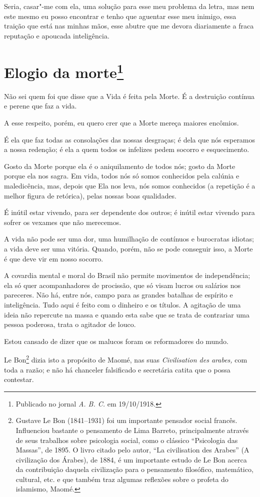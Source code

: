 Seria, casar"-me com ela, uma solução para esse meu problema da letra,
mas nem este mesmo eu posso encontrar e tenho que aguentar esse meu
inimigo, essa traição que está nas minhas mãos, esse abutre que me
devora diariamente a fraca reputação e apoucada inteligência.

\chapter[Elogio da morte]{Elogio da morte\footnote[*]{Publicado no jornal \emph{A. B. C.} em 19/10/1918.}}

Não sei quem foi que disse que a Vida é feita pela Morte. É a destruição
contínua e perene que faz a vida.

A esse respeito, porém, eu quero crer que a Morte mereça maiores
encômios.

É ela que faz todas as consolações das nossas desgraças; é dela que nós
esperamos a nossa redenção; é ela a quem todos os infelizes pedem
socorro e esquecimento.

Gosto da Morte porque ela é o aniquilamento de todos nós; gosto da Morte
porque ela nos sagra. Em vida, todos nós só somos conhecidos pela
calúnia e maledicência, mas, depois que Ela nos leva, nós somos
conhecidos (a repetição é a melhor figura de retórica), pelas nossas
boas qualidades.

É inútil estar vivendo, para ser dependente dos outros; é inútil estar
vivendo para sofrer os vexames que não merecemos.

A vida não pode ser uma dor, uma humilhação de contínuos e burocratas
idiotas; a vida deve ser uma vitória. Quando, porém, não se pode
conseguir isso, a Morte é que deve vir em nosso socorro.

A covardia mental e moral do Brasil não permite movimentos de
independência; ela só quer acompanhadores de procissão, que só visam
lucros ou salários nos pareceres. Não há, entre nós, campo para as
grandes batalhas de espírito e inteligência. Tudo aqui é feito com o
dinheiro e os títulos. A agitação de uma ideia não repercute na massa e
quando esta sabe que se trata de contrariar uma pessoa poderosa, trata o
agitador de louco.

Estou cansado de dizer que os malucos foram os reformadores do mundo.

Le Bon\footnote{Gustave Le Bon (1841--1931) foi um importante pensador
  social francês. Influenciou bastante o pensamento de Lima Barreto,
  principalmente através de seus trabalhos sobre psicologia social, como
  o clássico ``Psicologia das Massas'', de 1895. O livro citado pelo
  autor, ``La civilisation des Arabes'' (A civilização dos Árabes), de
  1884, é um importante estudo de Le Bon acerca da contribuição daquela
  civilização para o pensamento filosófico, matemático, cultural, etc. e
  que também traz algumas reflexões sobre o profeta do islamismo, Maomé.}
dizia isto a propósito de Maomé, nas suas \emph{Civilisation des
arabes,} com toda a razão; e não há chanceler falsificado e secretária
catita que o possa contestar.

